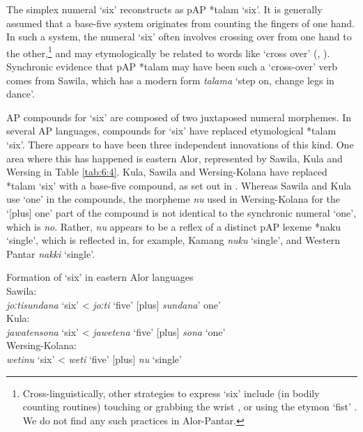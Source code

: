 The simplex numeral `six' reconstructs as pAP *talam `six'. It is generally assumed that a base-five system originates from counting the fingers of one hand. In such a system, the numeral `six' often involves crossing over from one hand to the other,\footnote{Cross-linguistically, other strategies to express `six' include (in bodily counting routines) touching or grabbing the wrist \citep{Evans2009,Donohue2008num}, or using the etymon `fist' \citep[343]{Plank2009}. We do not find any such practices in Alor-Pantar.} and may etymologically be related to words like `cross over' (\citealt{Majewicz1981,Majewicz1984}, \citealt[399-401]{Lynch2009}). Synchronic evidence that pAP *talam may have been such a `cross-over' verb comes from Sawila, which has a modern form \textit{talama{\ng}} `step on, change legs in dance'. 

AP compounds for `six' are composed of two juxtaposed numeral morphemes. In several AP languages, compounds for `six' have replaced etymological *talam `six'. There appears to have been three independent innovations of this kind. One area where this has happened is eastern Alor, represented by Sawila, Kula and Wersing in Table \ref{tab:6:4}. Kula, Sawila and Wersing-Kolana have replaced *talam `six' with a base-five compound, as set out in . Whereas Sawila and Kula use `one' in the compounds, the morpheme \textit{nu}\textit{{\ng}} used in Wersing-Kolana for the `[plus] one' part of the compound is not identical to the synchronic numeral `one', which is \textit{no}. Rather, \textit{nu}\textit{{\ng}} appears to be a reflex of a distinct pAP lexeme *naku{\ng} `single', which is reflected in, for example, Kamang \textit{nuku}\textit{{\ng}} `single', and Western Pantar \textit{nakki}\textit{{\ng}} `single'.



\ea%
\label{ex:6:4}
\upshape Formation of `six' in eastern Alor languages\\
 Sawila:\\
 \textit{joːti}\textit{{\ng}}\textit{sundana}\textbf{}   `six'   {\textless} \textit{joːti}\textit{{\ng}} `five'   [plus] \textit{sundana}' one'\\
   Kula:\\
   \textit{jawatensona}\textbf{}   `six'   {\textless} \textit{jawetena} `five' [plus] \textit{sona} `one'    \\
   Wersing-Kolana:\\   \textit{weti}\textit{{\ng}}\textit{nu}\textit{{\ng}}  `six'   {\textless} \textit{weti}\textit{{\ng}} `five'   [plus] \textit{nu}\textit{{\ng}} `single'    \\ 
\z


